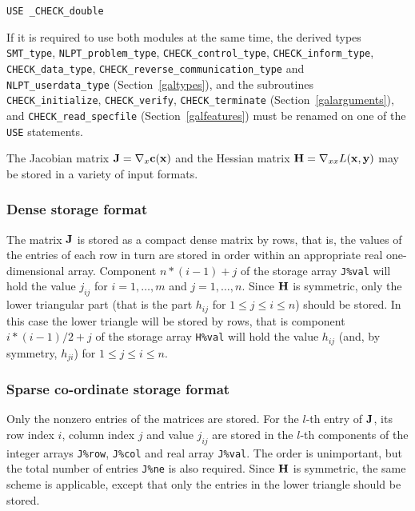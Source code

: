 \documentclass{galahad}
\newcommand{\packagename}{CHECK}
\newcommand{\fullpackagename}{\libraryname\_\packagename}
\begin{document}
\medskip{}

\hspace{8mm} {\tt USE  \fullpackagename\_double}

\medskip

\noindent
If it is required to use both modules at the same time, the derived types 
{\tt SMT\_type}, 
{\tt NLPT\_problem\_type}, 
{\tt \packagename\_\-control\_type}, 
{\tt \packagename\_inform\_type},
{\tt \packagename\_data\_type},
{\tt \packagename\_reverse\_communication\_type} and
{\tt NLPT\_userdata\_\-type}
(Section~\ref{galtypes}),
and the subroutines
{\tt \packagename\_initialize}, 
{\tt \packagename\_verify},
{\tt \packagename\_terminate}
(Section~\ref{galarguments}),
and 
{\tt \packagename\_read\_specfile}
(Section~\ref{galfeatures})
must be renamed on one of the {\tt USE} statements.


\galmatrix
The Jacobian matrix ${\mathbf{J}} = \nabla_x{\mathbf{c}}({\mathbf{x}})$ and the Hessian matrix ${\mathbf{H}} = \nabla_{xx} L({\mathbf{x}},{\mathbf{y}})$
may be stored in a variety of input formats.

\subsubsection{Dense storage format}\label{dense}
The matrix ${\mathbf{J}}$ is stored as a compact 
dense matrix by rows, that is, the values of the entries of each row in turn are
stored in order within an appropriate real one-dimensional array.
Component $n \ast (i-1) + j$ of the storage array {\tt J\%val} will hold the 
value $j_{ij}$ for $i = 1, \ldots , m$ and $j = 1, \ldots , n$.
Since ${\mathbf{H}}$ is symmetric, only the lower triangular part (that is the part 
$h_{ij}$ for $1 \leq j \leq i \leq n$) should be stored.  In this case
the lower triangle will be stored by rows, that is 
component $i \ast (i-1)/2 + j$ of the storage array {\tt H\%val}  
will hold the value $h_{ij}$ (and, by symmetry, $h_{ji}$)
for $1 \leq j \leq i \leq n$.

\subsubsection{Sparse co-ordinate storage format}\label{coordinate}
Only the nonzero entries of the matrices are stored. For the $l$-th
entry of ${\mathbf{J}}$, its row index $i$, column index $j$ and value
$j_{ij}$ are stored in the $l$-th components of the integer arrays
{\tt J\%row}, {\tt J\%col} and real array {\tt J\%val}.  The order is
unimportant, but the total number of entries {\tt J\%ne} is also
required.  Since ${\mathbf{H}}$ is symmetric, the same scheme is applicable,
except that only the entries in the lower triangle should be stored.
\end{document}
